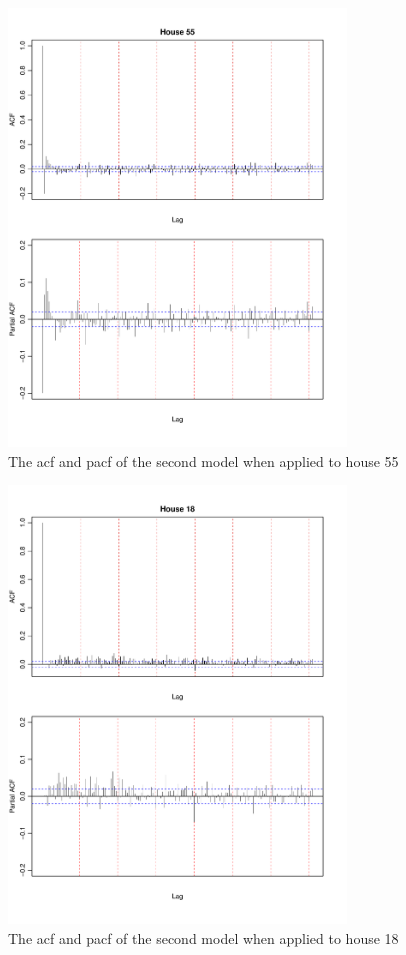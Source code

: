 \begin{figure}
    \centering
    \includegraphics[width=0.8\textwidth]{../../../figures/arimax/ACF_55_long.pdf}
    \caption{The acf and pacf of the second model when applied to house 55}
    \label{fig:Model2_acf_55_long}
\end{figure}    
\begin{figure}
    \centering
    \includegraphics[width=0.8\textwidth]{../../../figures/arimax/ACF_18_long.pdf}
    \caption{The acf and pacf of the second model when applied to house 18}
    \label{fig:Model2_acf_18_long}
\end{figure}    
